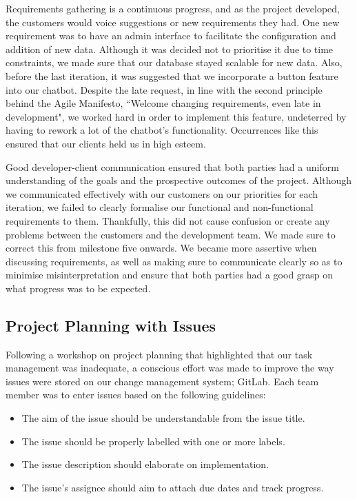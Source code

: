 \documentclass{l3proj}
\begin{document}
Requirements gathering is a continuous progress, and as the project developed, the customers would voice suggestions or new requirements they had. One new requirement was to have an admin interface to facilitate the configuration and addition of new data. Although it was decided not to prioritise it due to time constraints, we made sure that our database stayed scalable for new data. Also, before the last iteration, it was suggested that we incorporate a button feature into our chatbot. Despite the late request, in line with the second principle behind the Agile Manifesto, ``Welcome changing requirements, even late in development"\cite{agilemanifesto}, we worked hard in order to implement this feature, undeterred by having to rework a lot of the chatbot's functionality. Occurrences like this ensured that our clients held us in high esteem.

Good developer-client communication ensured that both parties had a uniform understanding of the goals and the prospective outcomes of the project. Although we communicated effectively with our customers on our priorities for each iteration, we failed to clearly formalise our functional and non-functional requirements to them. Thankfully, this did not cause confusion or create any problems between the customers and the development team. We made sure to correct this from milestone five onwards. We became more assertive when discussing requirements, as well as making sure to communicate clearly so as to minimise misinterpretation and ensure that both parties had a good grasp on what progress was to be expected.

\subsection{Project Planning with Issues}

Following a workshop on project planning that highlighted that our task management was inadequate, a conscious effort was made to improve the way issues were stored on our change management system; GitLab. Each team member was to enter issues based on the following guidelines:

\begin{itemize}
\item The aim of the issue should be understandable from the issue title.
\item The issue should be properly labelled with one or more labels.
\item The issue description should elaborate on implementation.
\item The issue's assignee should aim to attach due dates and track progress.
\end{itemize}
\end{document}
